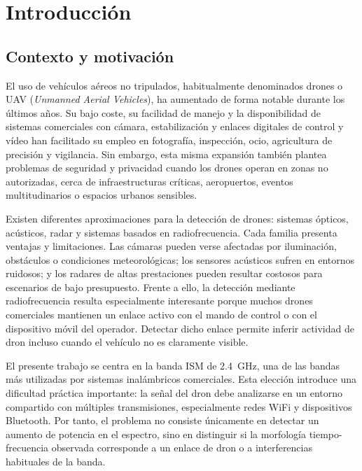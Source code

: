 \chapter{Introducción}
\label{cap:introduccion}

\section{Contexto y motivación}
\label{sec:contexto}

El uso de vehículos aéreos no tripulados, habitualmente denominados drones o UAV (\emph{Unmanned Aerial Vehicles}), ha aumentado de forma notable durante los últimos años. Su bajo coste, su facilidad de manejo y la disponibilidad de sistemas comerciales con cámara, estabilización y enlaces digitales de control y vídeo han facilitado su empleo en fotografía, inspección, ocio, agricultura de precisión y vigilancia. Sin embargo, esta misma expansión también plantea problemas de seguridad y privacidad cuando los drones operan en zonas no autorizadas, cerca de infraestructuras críticas, aeropuertos, eventos multitudinarios o espacios urbanos sensibles.

Existen diferentes aproximaciones para la detección de drones: sistemas ópticos, acústicos, radar y sistemas basados en radiofrecuencia. Cada familia presenta ventajas y limitaciones. Las cámaras pueden verse afectadas por iluminación, obstáculos o condiciones meteorológicas; los sensores acústicos sufren en entornos ruidosos; y los radares de altas prestaciones pueden resultar costosos para escenarios de bajo presupuesto. Frente a ello, la detección mediante radiofrecuencia resulta especialmente interesante porque muchos drones comerciales mantienen un enlace activo con el mando de control o con el dispositivo móvil del operador. Detectar dicho enlace permite inferir actividad de dron incluso cuando el vehículo no es claramente visible.


El presente trabajo se centra en la banda ISM de \SI{2.4}{\giga\hertz}, una de las bandas más utilizadas por sistemas inalámbricos comerciales. Esta elección introduce una dificultad práctica importante: la señal del dron debe analizarse en un entorno compartido con múltiples transmisiones, especialmente redes WiFi y dispositivos Bluetooth. Por tanto, el problema no consiste únicamente en detectar un aumento de potencia en el espectro, sino en distinguir si la morfología tiempo-frecuencia observada corresponde a un enlace de dron o a interferencias habituales de la banda.

